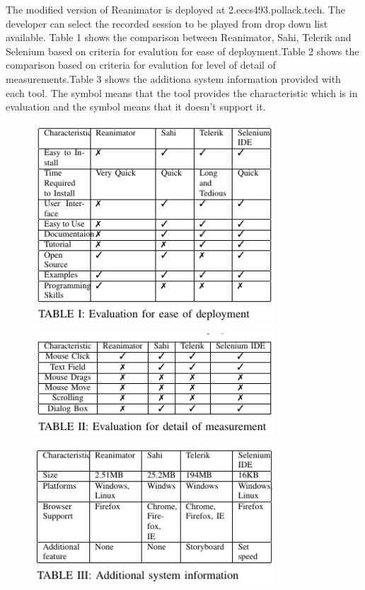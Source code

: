 \documentclass[12pt,journal]{IEEEtran}
\begin{document}
The modified version of Reanimator is deployed at 2.eecs493.pollack.tech. The developer can select the recorded session to be played from drop down list available.  
Table 1 shows the comparison between Reanimator, Sahi, Telerik  and Selenium based on criteria for evalution for ease of deployment.Table 2 shows the comparison  based on criteria for evalution for level of detail of measurements.Table 3 shows the additiona system information provided with each tool. The symbol  means that the tool provides the characteristic which is in evaluation and the symbol  means that it doesn’t support it. \\ 

\begin{figure}[h!]
 \hfill\includegraphics[width=9cm]{figures/table1.PNG}\hspace*{\fill}
\end{figure}
\begin{figure}[h!]
 \hfill\includegraphics[width=9cm]{figures/table2.PNG}\hspace*{\fill}
\end{figure}

\begin{figure}[h!]
 \hfill\includegraphics[width=9cm]{figures/table3.PNG}\hspace*{\fill}
\end{figure}
\end{document}
